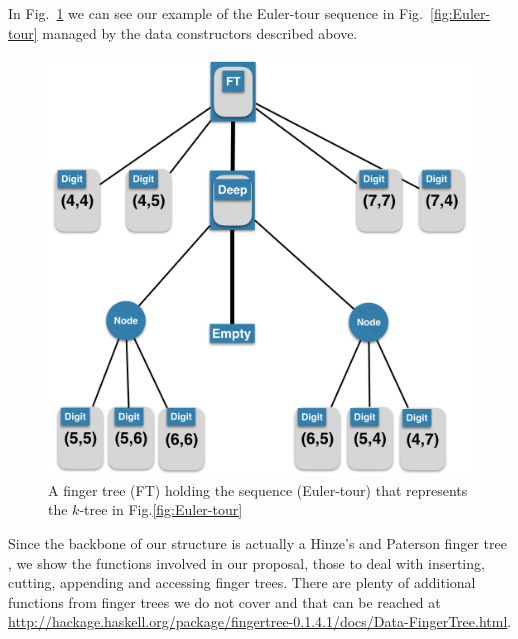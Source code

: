 In Fig.~\ref{fig:FT-Euler-tour} we can see our example of the Euler-tour sequence in Fig.~\ref{fig:Euler-tour} managed by the data constructors described above.

\begin{figure}[H]
\begin{center}
\includegraphics[scale=0.35]{./Images/FT-Euler-tour} 
\end{center}
\caption{A finger tree (FT) holding the sequence (Euler-tour) that represents the $k$-tree in Fig.\ref{fig:Euler-tour}}
\label{fig:FT-Euler-tour}
\end{figure}

Since the backbone of our structure \dyntset is actually a Hinze's and Paterson finger tree \cite{FTs}, we show the functions involved in our proposal, those to deal with inserting, cutting, appending and accessing finger trees. There are plenty of additional functions from finger trees we do not cover and that can be reached at \url{http://hackage.haskell.org/package/fingertree-0.1.4.1/docs/Data-FingerTree.html}.

